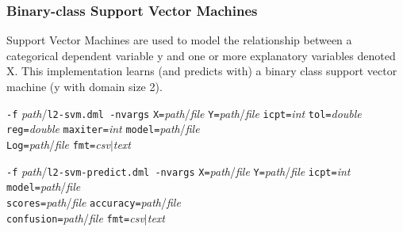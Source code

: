 \begin{comment}

 Licensed to the Apache Software Foundation (ASF) under one
 or more contributor license agreements.  See the NOTICE file
 distributed with this work for additional information
 regarding copyright ownership.  The ASF licenses this file
 to you under the Apache License, Version 2.0 (the
 "License"); you may not use this file except in compliance
 with the License.  You may obtain a copy of the License at

   http://www.apache.org/licenses/LICENSE-2.0

 Unless required by applicable law or agreed to in writing,
 software distributed under the License is distributed on an
 "AS IS" BASIS, WITHOUT WARRANTIES OR CONDITIONS OF ANY
 KIND, either express or implied.  See the License for the
 specific language governing permissions and limitations
 under the License.

\end{comment}

\subsubsection{Binary-class Support Vector Machines}
\label{l2svm}


Support Vector Machines are used to model the relationship between a categorical 
dependent variable y and one or more explanatory variables denoted X. This 
implementation learns (and predicts with) a binary class support vector machine 
(y with domain size 2).
\\


\begin{tabbing}
\texttt{-f} \textit{path}/\texttt{l2-svm.dml -nvargs} 
\=\texttt{X=}\textit{path}/\textit{file} 
  \texttt{Y=}\textit{path}/\textit{file} 
  \texttt{icpt=}\textit{int} 
  \texttt{tol=}\textit{double}\\
\>\texttt{reg=}\textit{double} 
  \texttt{maxiter=}\textit{int} 
  \texttt{model=}\textit{path}/\textit{file}\\
\>\texttt{Log=}\textit{path}/\textit{file}
  \texttt{fmt=}\textit{csv}$\vert$\textit{text}
\end{tabbing}

\begin{tabbing}
\texttt{-f} \textit{path}/\texttt{l2-svm-predict.dml -nvargs} 
\=\texttt{X=}\textit{path}/\textit{file} 
  \texttt{Y=}\textit{path}/\textit{file} 
  \texttt{icpt=}\textit{int} 
  \texttt{model=}\textit{path}/\textit{file}\\
\>\texttt{scores=}\textit{path}/\textit{file}
  \texttt{accuracy=}\textit{path}/\textit{file}\\
\>\texttt{confusion=}\textit{path}/\textit{file}
  \texttt{fmt=}\textit{csv}$\vert$\textit{text}
\end{tabbing}

